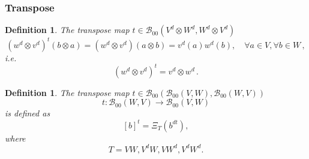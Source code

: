 \documentclass[aps,preprint]{revtex4}%
\newtheorem{definition}[theorem]{Definition}
\begin{document}
\subsubsection{Transpose}

\begin{definition}
The transpose map $t\in\mathcal{B}_{00}\left(  V^{d}\otimes W^{d},W^{d}\otimes
V^{d}\right)  $%
\begin{equation}
\left(  w^{d}\otimes v^{d}\right)  ^{t}\left(  b\otimes a\right)  =\left(
w^{d}\otimes v^{d}\right)  \left(  a\otimes b\right)  =v^{d}\left(  a\right)
w^{d}\left(  b\right)  ,\quad\forall a\in V,\forall b\in W\,,
\end{equation}
i.e.%
\begin{equation}
\left(  w^{d}\otimes v^{d}\right)  ^{t}=v^{d}\otimes w^{d}\,.
\end{equation}

\end{definition}

\begin{definition}
The transpose map $t\in\mathcal{B}_{00}\left(  \mathcal{B}_{00}\left(
V,W\right)  ,\mathcal{B}_{00}\left(  W,V\right)  \right)  $%
\begin{equation}
t:\mathcal{B}_{00}\left(  W,V\right)  \rightarrow\mathcal{B}_{00}\left(
V,W\right)
\end{equation}
is defined as%
\begin{equation}
\left[  b\right]  ^{t}=\Xi_{T}\left(  b^{dt}\right)  ,
\end{equation}
where
\begin{equation}
T=VW,V^{d}W,VW^{d},V^{d}W^{d}.
\end{equation}

\end{definition}
\end{document}
